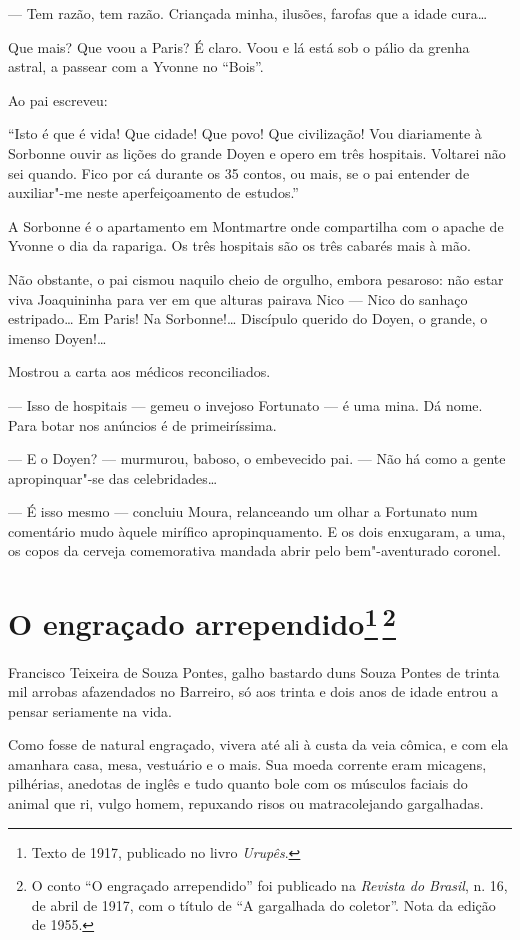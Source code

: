 --- Tem razão, tem razão. Criançada minha, ilusões, farofas que a idade
cura\ldots{}

Que mais? Que voou a Paris? É claro. Voou e lá está sob o pálio da
grenha astral, a passear com a Yvonne no ``Bois''.

Ao pai escreveu:

``Isto é que é vida! Que cidade! Que povo! Que civilização! Vou
diariamente à Sorbonne ouvir as lições do grande Doyen e opero em três
hospitais. Voltarei não sei quando. Fico por cá durante os 35 contos, ou
mais, se o pai entender de auxiliar"-me neste aperfeiçoamento de
estudos.''

A Sorbonne é o apartamento em Montmartre onde compartilha com o apache
de Yvonne o dia da rapariga. Os três hospitais são os três cabarés mais
à mão.

Não obstante, o pai cismou naquilo cheio de orgulho, embora pesaroso:
não estar viva Joaquininha para ver em que alturas pairava Nico --- Nico
do sanhaço estripado\ldots{} Em Paris! Na Sorbonne!\ldots{} Discípulo querido do
Doyen, o grande, o imenso Doyen!\ldots{}

Mostrou a carta aos médicos reconciliados.

--- Isso de hospitais --- gemeu o invejoso Fortunato --- é uma mina. Dá
nome. Para botar nos anúncios é de primeiríssima.

--- E o Doyen? --- murmurou, baboso, o embevecido pai. --- Não há como a
gente apropinquar"-se das celebridades\ldots{}

--- É isso mesmo --- concluiu Moura, relanceando um olhar a Fortunato
num comentário mudo àquele mirífico apropinquamento. E os dois
enxugaram, a uma, os copos da cerveja comemorativa mandada abrir pelo
bem"-aventurado coronel.

\chapter{O engraçado arrependido\footnote[*]{Texto de 1917, publicado no livro \emph{Urupês}.}\,\footnote[**]{O conto ``O
  engraçado arrependido'' foi publicado na \emph{Revista do Brasil}, n.
  16, de abril de 1917, com o título de ``A gargalhada do coletor''.
  Nota da edição de 1955.}}

Francisco Teixeira de Souza Pontes, galho bastardo duns Souza Pontes de
trinta mil arrobas afazendados no Barreiro, só aos trinta e dois anos de
idade entrou a pensar seriamente na vida.

Como fosse de natural engraçado, vivera até ali à custa da veia cômica,
e com ela amanhara casa, mesa, vestuário e o mais. Sua moeda corrente
eram micagens, pilhérias, anedotas de inglês e tudo quanto bole com os
músculos faciais do animal que ri, vulgo homem, repuxando risos ou
matracolejando gargalhadas.

